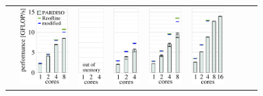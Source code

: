 \begin{tabular}{lcccccccc}

\raisebox{1.70cm}{\rotatebox[origin=c]{90}{omen1}} &
  \includegraphics[height=3.0cm,clip=true]{images/perf/p-80/p-emmy-omen-rgf-tc2_5-lc160}%
  & 
  \includegraphics[height=3.0cm,clip=true]{images/perf/p-80/p-woody-hsw-omen-rgf-tc2_5-lc160}%
  & 
  \includegraphics[height=3.0cm,clip=true]{images/perf/p-80/p-hasep1-omen-rgf-tc2_5-lc160}%
  & 
  \includegraphics[height=3.0cm,clip=true]{images/perf/p-80/p-meggie-omen-rgf-tc2_5-lc160}%
  & 
  \includegraphics[height=3.0cm,clip=true]{images/perf/p-80/p-skylakesp2-omen-rgf-tc2_5-lc160}%

\end{tabular}
